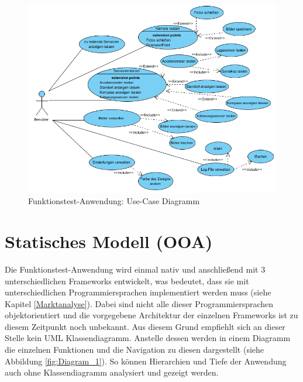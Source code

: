 \begin{figure}[h]
	\centering
	\includegraphics[width=1\textwidth]{Bilder/Use_Case.PNG}
	\caption{Funktionstest-Anwendung: Use-Case Diagramm}
	\label{fig:Use_Case}
\end{figure}

\section{Statisches Modell (OOA)} \label{OOAStatMod}

Die Funktionstest-Anwendung wird einmal nativ und anschließend mit 3 unterschiedlichen Frameworks entwickelt, was bedeutet, dass sie mit unterschiedlichen Programmiersprachen implementiert werden muss (siehe Kapitel \ref{Marktanalyse}). Dabei sind nicht alle dieser Programmiersprachen objektorientiert und die vorgegebene Architektur der einzelnen Frameworks ist zu diesem Zeitpunkt noch unbekannt. Aus diesem Grund empfiehlt sich an dieser Stelle kein UML Klassendiagramm. Anstelle dessen werden in einem Diagramm die einzelnen Funktionen und die Navigation zu diesen dargestellt (siehe Abbildung \ref{fig:Diagram_1}). So können Hierarchien und Tiefe der Anwendung auch ohne Klassendiagramm analysiert und gezeigt werden.  


